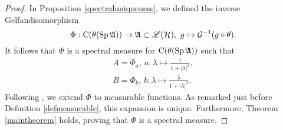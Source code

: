 \begin{proof}
 
 In Proposition \ref{spectraluniqueness}, we defined the inverse Gelfandisomorphism 
 \[
  \Phi : \operatorname{C} ( \theta (\operatorname{Sp} \mathfrak{A})) \to \mathfrak{A} \subset \mathscr{L}(\mathcal{H}),~ g \mapsto \mathcal{G} ^{-1}
  (g \circ \theta).
 \]
 It follows that $\Phi$ is a spectral measure for $\operatorname{C}( \theta (\operatorname{Sp} \mathfrak{A})) $ such that
 \begin{align*}
  A = \Phi_a, ~ a: \lambda \mapsto \frac{1}{1+ | \lambda| ^2 }, \\
  B = \Phi_b, ~ b: \lambda \mapsto \frac{\lambda}{1 + | \lambda | ^2}.
 \end{align*}
 Following \cite[Ch. 4.5]{PedAnaN}, we extend $\Phi$ to measurable functions. 
 As remarked just before Definition \ref{defmeasurable}, this expansion is
 unique. Furthermore, Theorem \ref{maintheorem} holds, proving that
 $\Phi$ is a spectral measure.
 

\end{proof}
